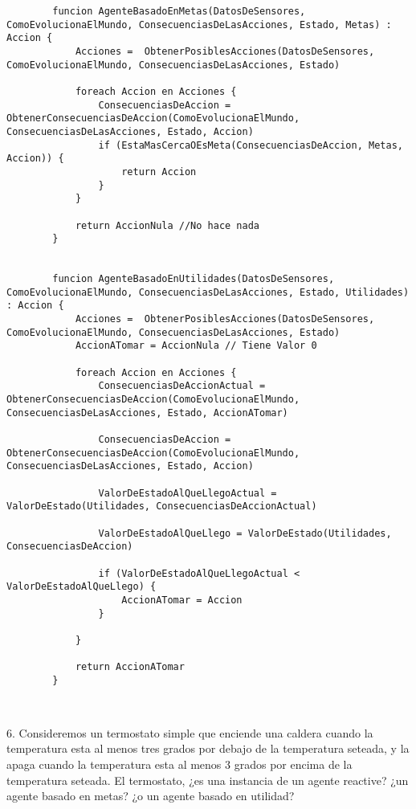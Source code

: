 \begin{center}
	\begin{lstlisting}
		funcion AgenteBasadoEnMetas(DatosDeSensores, ComoEvolucionaElMundo, ConsecuenciasDeLasAcciones, Estado, Metas) : Accion {
			Acciones =  ObtenerPosiblesAcciones(DatosDeSensores, ComoEvolucionaElMundo, ConsecuenciasDeLasAcciones, Estado)
			
			foreach Accion en Acciones {
				ConsecuenciasDeAccion = ObtenerConsecuenciasDeAccion(ComoEvolucionaElMundo, ConsecuenciasDeLasAcciones, Estado, Accion)
				if (EstaMasCercaOEsMeta(ConsecuenciasDeAccion, Metas, Accion)) {
					return Accion
				}
			}
			
			return AccionNula //No hace nada
		}
		
		
		funcion AgenteBasadoEnUtilidades(DatosDeSensores, ComoEvolucionaElMundo, ConsecuenciasDeLasAcciones, Estado, Utilidades) : Accion {
			Acciones =  ObtenerPosiblesAcciones(DatosDeSensores, ComoEvolucionaElMundo, ConsecuenciasDeLasAcciones, Estado)
			AccionATomar = AccionNula // Tiene Valor 0
			
			foreach Accion en Acciones {
				ConsecuenciasDeAccionActual = ObtenerConsecuenciasDeAccion(ComoEvolucionaElMundo, ConsecuenciasDeLasAcciones, Estado, AccionATomar)
				
				ConsecuenciasDeAccion = ObtenerConsecuenciasDeAccion(ComoEvolucionaElMundo, ConsecuenciasDeLasAcciones, Estado, Accion)
				
				ValorDeEstadoAlQueLlegoActual = ValorDeEstado(Utilidades, ConsecuenciasDeAccionActual)
				
				ValorDeEstadoAlQueLlego = ValorDeEstado(Utilidades, ConsecuenciasDeAccion)
				
				if (ValorDeEstadoAlQueLlegoActual < ValorDeEstadoAlQueLlego) {
					AccionATomar = Accion
				}
				
			}
			
			return AccionATomar
		}
		
		
	\end{lstlisting}
\end{center}



6. Consideremos un termostato simple que enciende una caldera cuando la temperatura esta al menos tres grados por debajo de la temperatura seteada, y la apaga cuando la temperatura esta al menos 3 grados por encima de la temperatura seteada. El termostato, ¿es una instancia de un agente reactive? ¿un agente basado en metas? ¿o un agente basado en utilidad?\textbf{}

\bigskip